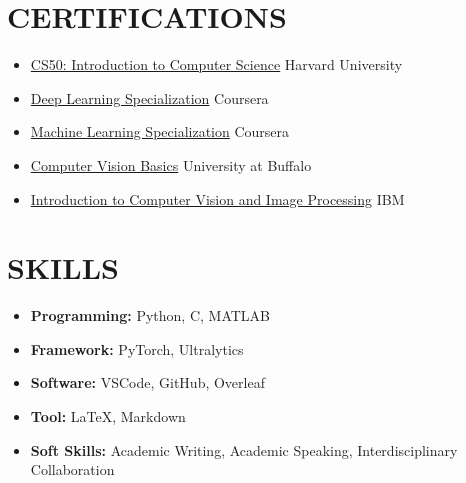 \documentclass[a4paper,9pt]{extarticle}
\begin{document}
\section*{CERTIFICATIONS}
\begin{itemize}
    \item \href{https://certificates.cs50.io/3f3f35e9-bda6-4487-84a3-2d11b3706bba.pdf?size=letter}{CS50: Introduction to Computer Science} \hfill Harvard University
    \item \href{https://www.credly.com/badges/6dfef240-b0c0-423f-9c94-897d0940c790/public_url}{Deep Learning Specialization} \hfill Coursera
    \item \href{https://www.coursera.org/account/accomplishments/specialization/N234W2TA9VF3}{Machine Learning Specialization} \hfill Coursera
    \item \href{https://www.coursera.org/account/accomplishments/certificate/L9TKVLPXS79W}{Computer Vision Basics} \hfill University at Buffalo
    \item \href{https://www.credly.com/go/GHFkiYLI}{Introduction to Computer Vision and Image Processing} \hfill IBM
\end{itemize}

\section*{SKILLS}
\begin{itemize}
    \item \textbf{Programming:} Python, C, MATLAB
    \item \textbf{Framework:} PyTorch, Ultralytics
    \item \textbf{Software:} VSCode, GitHub, Overleaf
    \item \textbf{Tool:} LaTeX, Markdown
    \item \textbf{Soft Skills:} Academic Writing, Academic Speaking, Interdisciplinary Collaboration
\end{itemize}
\end{document}
